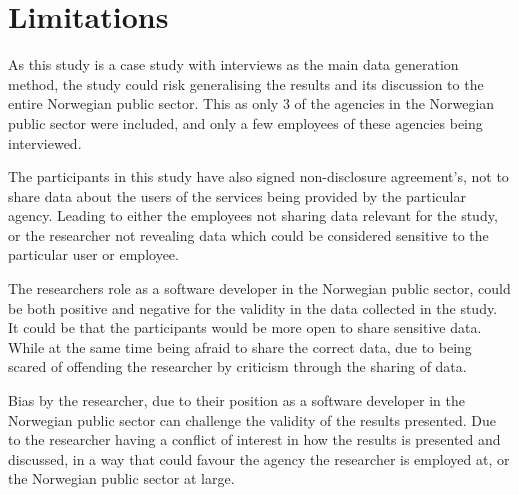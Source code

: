 

\section{Limitations}
As this study is a case study with interviews as the main data generation method, the study could risk generalising the results and its discussion to the entire Norwegian public sector. This as only 3 of the agencies in the Norwegian public sector were included, and only a few employees of these agencies being interviewed.

The participants in this study have also signed non-disclosure agreement's, not to share data about the users of the services being provided by the particular agency. Leading to either the employees not sharing data relevant for the study, or the researcher not revealing data which could be considered sensitive to the particular user or employee. 

The researchers role as a software developer in the Norwegian public sector, could be both positive and negative for the validity in the data collected in the study. It could be that the participants would be more open to share sensitive data. While at the same time being afraid to share the correct data, due to being scared of offending the researcher by criticism through the sharing of data.

Bias by the researcher, due to their position as a software developer in the Norwegian public sector can challenge the validity of the results presented. Due to the researcher having a conflict of interest in how the results is presented and discussed, in a way that could favour the agency the researcher is employed at, or the Norwegian public sector at large.

